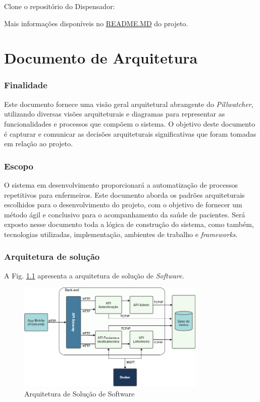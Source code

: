 \begin{apendicesenv}
Clone o repositório do Dispensador:

Mais informações disponíveis no \href{https://github.com/PillWatcher/pillwatcher-dpb-admin-service}{README.MD} do projeto.

\chapter{Documento de Arquitetura}

\subsection*{Finalidade}

Este documento fornece uma visão geral arquitetural abrangente do \textit{Pillwatcher}, utilizando diversas visões arquiteturais e diagramas para representar as funcionalidades e processos que compõem o sistema. O objetivo deste documento é capturar e comunicar as decisões arquiteturais significativas que foram tomadas em relação ao projeto.

\subsection*{Escopo}

O sistema em desenvolvimento proporcionará a automatização de processos repetitivos para enfermeiros. Este documento aborda os padrões arquiteturais escolhidos para o desenvolvimento do projeto, com o objetivo de fornecer um método ágil e conclusivo para o acompanhamento da saúde de pacientes. Será exposto nesse documento toda a lógica de construção do sistema, como também, tecnologias utilizadas, implementação, ambientes de trabalho e \textit{frameworks}.

\subsection*{Arquitetura de solução}

A Fig. \ref{fig:software_solution_apdc} apresenta a arquitetura de solução de \textit{Software}.

\begin{figure}[H]
    \centering
    \includegraphics[width=0.8\textwidth]{figuras/software/solucao_software_2.png}
    \caption{Arquitetura de Solução de Software}
    \label{fig:software_solution_apdc}
\end{figure}


\end{apendicesenv}
